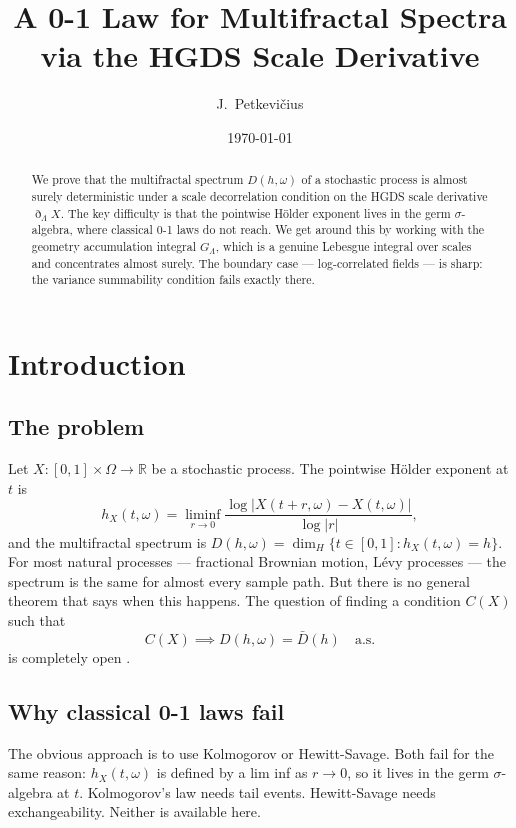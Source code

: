 \documentclass[11pt,a4paper]{article}
\title{A 0-1 Law for Multifractal Spectra\\
via the HGDS Scale Derivative}
\author{J.\ Petkevi\v{c}ius}
\date{\today}
\theoremstyle{definition}
\theoremstyle{remark}
\newcommand{\R}{\mathbb{R}}
\newcommand{\GL}{G_\Lambda}
\begin{document}
\maketitle

\begin{abstract}
We prove that the multifractal spectrum $D(h,\omega)$ of a stochastic
process is almost surely deterministic under a scale decorrelation
condition on the HGDS scale derivative $\eth_\Lambda X$. The key
difficulty is that the pointwise H\"{o}lder exponent lives in the germ
$\sigma$-algebra, where classical 0-1 laws do not reach. We get around
this by working with the geometry accumulation integral $\GL$, which is
a genuine Lebesgue integral over scales and concentrates almost surely.
The boundary case --- log-correlated fields --- is sharp: the variance
summability condition fails exactly there.
\end{abstract}

\tableofcontents
\newpage

\section{Introduction}

\subsection{The problem}

Let $X:[0,1]\times\Omega\to\R$ be a stochastic process. The pointwise
H\"{o}lder exponent at $t$ is
\[
  h_X(t,\omega)
  = \liminf_{r\to0}\frac{\log|X(t+r,\omega)-X(t,\omega)|}{\log|r|},
\]
and the multifractal spectrum is
$D(h,\omega)=\dim_H\{t\in[0,1]:h_X(t,\omega)=h\}$. For most natural
processes --- fractional Brownian motion, L\'{e}vy processes --- the
spectrum is the same for almost every sample path. But there is no
general theorem that says when this happens. The question of finding a
condition $C(X)$ such that
\[
  C(X)\implies D(h,\omega)=\bar D(h)\quad\text{a.s.}
\]
is completely open \cite{jaffardseuret2022}.

\subsection{Why classical 0-1 laws fail}

The obvious approach is to use Kolmogorov or Hewitt-Savage. Both fail
for the same reason: $h_X(t,\omega)$ is defined by a lim inf as
$r\to0$, so it lives in the germ $\sigma$-algebra at $t$. Kolmogorov's
law needs tail events. Hewitt-Savage needs exchangeability. Neither is
available here.
\end{document}
